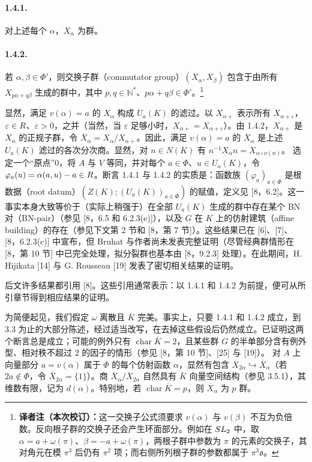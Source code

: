 \paragraph*{1.4.1.}对上述每个 $\alpha$，$X_\alpha$ 为群。

\paragraph*{1.4.2.}若 $\alpha,\beta\in\Phi'$，则交换子群（commutator group）$(X_\alpha,X_\beta)$ 包含于由所有 $X_{p\alpha+q\beta}$ 生成的群中，其中 $p,q\in\mathbb N^*$、$p\alpha+q\beta\in\Phi'$。\footnote{\textbf{译者注（本次校订）：}这一交换子公式须要求 $v(\alpha)$ 与 $v(\beta)$ 不互为负倍数。反向根子群的交换子还会产生环面部分。例如在 $SL_2$ 中，取 $\alpha=a+\omega(\pi)$、$\beta=-a+\omega(\pi)$，两根子群中参数为 $\pi$ 的元素的交换子，其对角元在模 $\pi^3$ 后仍有 $\pi^2$ 项；而右侧所列根子群的参数都属于 $\pi^3\mathfrak o$。}

显然，满足 $v(\alpha)=a$ 的 $X_\alpha$ 构成 $U_a(K)$ 的滤过。以 $X_{\alpha+}$ 表示所有 $X_{\alpha+\varepsilon}$，$\varepsilon\in R$、$\varepsilon>0$，之并（当然，当 $\varepsilon$ 足够小时，$X_{\alpha+}=X_{\alpha+\varepsilon}$）。由 1.4.2，$X_{\alpha+}$ 是 $X_\alpha$ 的正规子群，令 $\overline X_\alpha=X_\alpha/X_{\alpha+}$。因此，满足 $v(\alpha)=a$ 的 $\overline X_\alpha$ 是上述 $U_a(K)$ 滤过的各次分次商。显然，对 $n\in N(K)$ 有 $n^{-1}X_\alpha n=X_{\alpha\circ\nu(n)}$。
选定一个“原点”$0$，将 $A$ 与 $V$ 等同，并对每个 $a\in\Phi$、$u\in U_a(K)$，令 $\varphi_a(u)=\alpha(a,u)-a\in R$。断言 1.4.1 与 1.4.2 的实质是：函数族 $(\varphi_a)_{a\in\Phi}$ 是根数据（root datum）$(Z(K);(U_a(K))_{a\in\Phi})$ 的赋值，定义见 [8，6.2]。这一事实本身大致等价于（实际上稍强于）在全部 $U_a(K)$ 生成的群中存在某个 BN 对（BN-pair）（参见 [8，6.5 和 6.2.3(e)]），以及 $G$ 在 $K$ 上的仿射建筑（affine building）的存在（参见下文第 2 节和 [8，第 7 节]）。这些结果已在 [6]、[7]、[8，6.2.3(c)] 中宣布，但 Bruhat 与作者尚未发表完整证明（尽管经典群情形在 [8，第 10 节] 中已完全处理，拟分裂群也基本由 [8，9.2.3] 处理）。在此期间，H. Hijikata [14] 与 G. Rousseau [19] 发表了密切相关结果的证明。

后文许多结果都引用 [8]。这些引用通常表示：以 1.4.1 和 1.4.2 为前提，便可从所引章节得到相应结果的证明。

为简便起见，我们假定 $\omega$ 离散且 $\overline K$ 完美。事实上，只要 1.4.1 和 1.4.2 成立，到 3.3 为止的大部分陈述，经过适当改写，在去掉这些假设后仍然成立。已证明这两个断言总是成立；可能的例外只有 $\operatorname{char}\overline K=2$，且某些群 $G$ 的半单部分含有例外型、相对秩不超过 $2$ 的因子的情形（参见 [8，第 10 节]、[25] 与 [19]）。
对 $A$ 上向量部分 $a=v(\alpha)$ 属于 $\Phi$ 的每个仿射函数 $\alpha$，显然有包含 $\overline X_{2\alpha}\hookrightarrow\overline X_\alpha$（若 $2a\notin\Phi$，令 $\overline X_{2\alpha}=\{1\}$）。商 $\overline X_\alpha/\overline X_{2\alpha}$ 自然具有 $\overline K$ 向量空间结构（参见 3.5.1），其维数有限，记为 $d(\alpha)$。特别地，若 $\operatorname{char}\overline K=p$，则 $\overline X_\alpha$ 为 $p$ 群。

